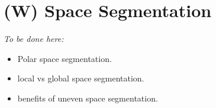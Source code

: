 \section{(W) Space Segmentation}\label{s:spaceSegmentation}
    \emph{To be done here:}
    \begin{itemize}
        \item Polar space segmentation.
        \item local vs global space segmentation.
        \item benefits of uneven space segmentation.
    \end{itemize}